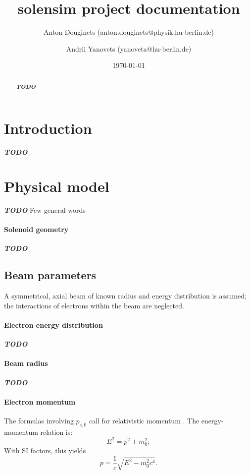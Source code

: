 \documentclass[a4paper,12pt]{article}
\title{solensim project documentation}
\author{Anton Douginets (anton.douginets@physik.hu-berlin.de)
	\and
	Andrii Yanovets (yanoveta@hu-berlin.de)}
\date{\today}
\newcommand{\todo}{\textbf{\textit{TODO}} }
\begin{document}
\thispagestyle{empty}
\maketitle

\begin{abstract}
  \todo
\end{abstract}

\tableofcontents

\newpage

\section{Introduction}
  \todo
\newpage

\section{Physical model}
  \todo Few general words

  \paragraph{Solenoid geometry} \todo

  \subsection{Beam parameters}
    A symmetrical, axial beam of known radius and energy distribution is assumed; the interactions of electrons within the beam are neglected.
    \paragraph{Electron energy distribution}
    \todo \cite{AREALRF}

    \paragraph{Beam radius}
    \todo \cite{Disser}

    \paragraph{Electron momentum}
    The formulas involving $p_{z,0}$ call for relativistic momentum \cite[p. 27]{Disser}. The energy-momentum relation is:
    \[
      E^2 = p^2 + m_0^2;
    \]
      With SI factors, this yields
    \begin{equation}
	     p = \frac{1}{c}\sqrt{E^2 - m_0^2c^4}.
      \end{equation}
\end{document}
